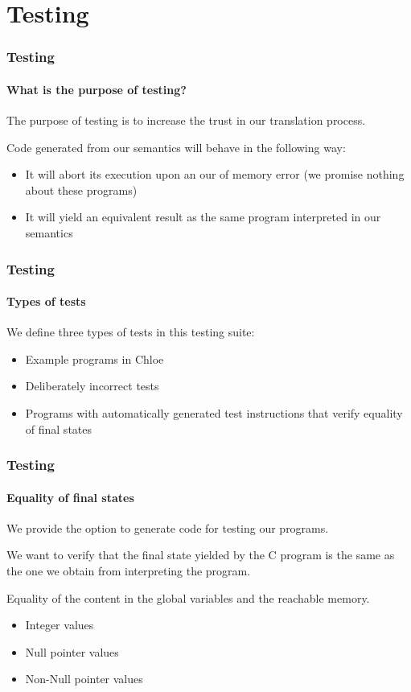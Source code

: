 \section{Testing}

\begin{frame}
\frametitle{Testing}
\framesubtitle{What is the purpose of testing?}

The purpose of testing is to increase the trust in our translation process.

\bigskip

Code generated from our semantics will behave in the following way:
\begin{itemize}
\item{It will abort its execution upon an our of memory error (we promise nothing about these programs)}
\item{It will yield an equivalent result as the same program interpreted in our semantics}
\end{itemize}


\end{frame}


\begin{frame}
\frametitle{Testing}
\framesubtitle{Types of tests}

We define three types of tests in this testing suite:

\begin{itemize}
\item{Example programs in Chloe}
\item{Deliberately incorrect tests}
\item{Programs with automatically generated test instructions that verify equality of final states}
\end{itemize}


\end{frame}


\begin{frame}
\frametitle{Testing}
\framesubtitle{Equality of final states}

We provide the option to generate code for testing our programs.

We want to verify that the final state yielded by the C program is the same as the one we obtain from interpreting the program.

\begin{block}{Equality of the content in the global variables and  the reachable memory.}
\begin{itemize}
\item{Integer values}
\item{Null pointer values}
\item{Non-Null pointer values}
\end{itemize}
\end{block}


\end{frame}


